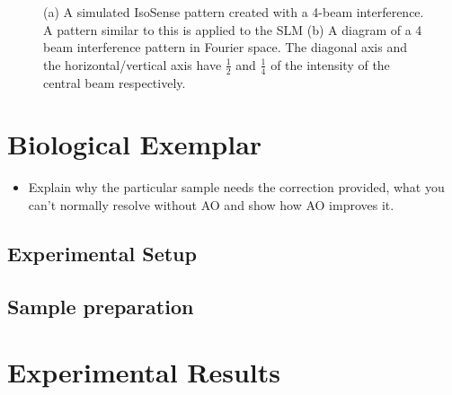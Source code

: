 \begin{figure}[h]
\begin{subfigure}{0.4\textwidth}
		\caption{}
		\label{fig:isosense_visualisation_ft}
	\end{subfigure}
	\caption{(a) A simulated IsoSense pattern created with a 4-beam interference. A pattern similar to this is applied to the SLM (b) A diagram of a 4 beam interference pattern in Fourier space. The diagonal axis and the horizontal/vertical axis have $\frac{1}{2}$ and $\frac{1}{4}$ of the intensity of the central beam respectively.}
	\label{fig:isosense_visualisation}
\end{figure}

\section{Biological Exemplar}
\label{sec:SIM_biology}

\begin{itemize}
	\item Explain why the particular sample needs the correction provided, what you can't normally resolve without AO and show how  AO improves it.
\end{itemize}

\subsection{Experimental Setup}
\label{subsec:SIM_setup}

\subsection{Sample preparation}
\label{subsec:SIM_sample_prep}

\section{Experimental Results}
\label{sec:SIM_results}
